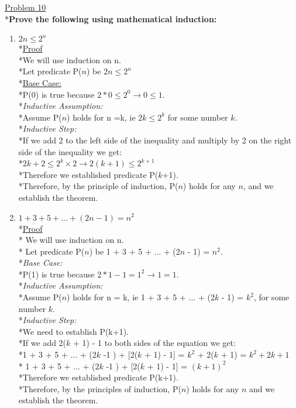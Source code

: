 \documentclass[12pt]{article}
\begin{document}
\noindent
\uline{Problem 10}
\\*\textbf{Prove the following using mathematical induction:}
\begin{enumerate}
	\item \textbf{$2n \leq 2^n$}
	\medskip
	\\*\uline{Proof}
	\medskip
	\\*We will use induction on n.
	\bigskip
	\\*Let predicate P($n$) be $2n \leq 2^n$
	\bigskip
	\\*\uline{Base Case: }
	\\*P(0) is true because $2*0 \leq 2^0 \rightarrow 0 \leq 1$.
	\bigskip
	\\*\textit{Inductive Assumption:}
	\\*Assume P($n$) holds for n =k, ie $2k \leq 2^k$ for some number $k$.
	\\*\textit{Inductive Step:}
	\\*If we add 2 to the left side of the inequality and multiply by 2 on the right side of the inequality we get:
	\\*$2k + 2 \leq 2^k \times 2 \rightarrow 2(k+1) \leq 2^{k+1}$
	\\*Therefore we established predicate P($k$+1).
	\bigskip
	\\*Therefore, by the principle of induction, P($n$) holds for any $n$, and we establish the theorem. 
	\bigskip
	
	
	
	\item \textbf{$1+3+5+...+(2n-1)=n^2$}
	\medskip
	\\*\uline{Proof}
	\medskip
	\\* We will use induction on n.
	\bigskip
	\\* Let predicate P($n$) be 1 + 3 + 5 + ... + (2$n$ - 1) = $n^2$.
	\bigskip
	\\*\textit{Base Case:}
	\\*P(1) is true because $2*1 - 1 = 1^2 \rightarrow 1 = 1$.
	\bigskip
	\\*\textit{Inductive Assumption:}
	\\*Assume P($n$) holds for n = k, ie 1 + 3 + 5 + ... + (2$k$ - 1) = $k^2$, for some number $k$.
	\\*\textit{Inductive Step:}
	\\*We need to establish P(k+1).
	\\*If we add 2($k$ + 1) - 1 to both sides of the equation we get:
	\\*1 + 3 + 5 + ... + (2$k$ -1 ) + [2($k$ + 1) - 1] = $k^2$ + 2($k$ + 1) = $k^2 + 2k + 1$
	\\* 1 + 3 + 5 + ... + (2$k$ -1 ) + [2($k$ + 1) - 1] = $(k + 1)^2$
	\\*Therefore we established predicate P(k+1).
	\bigskip
	\\*Therefore, by the principles of induction, P($n$) holds for any $n$ and we establish the theorem. 
	

\end{enumerate}
\end{document}

